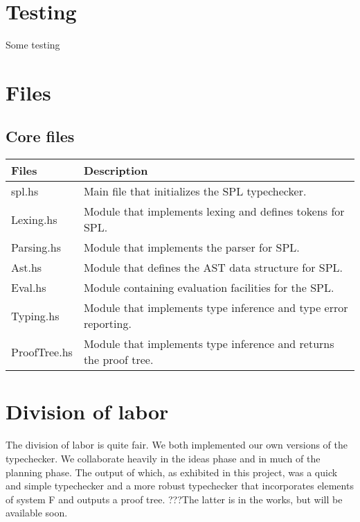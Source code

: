 \documentclass{article}
\begin{document}
\begin{prooftree}
\end{prooftree}

\begin{prooftree}
\end{prooftree}

\section{Testing}

Some testing

\section{Files}
\subsection{Core files}
\begin{tabular}{|p{20mm}|p{93mm}|}
  \hline
{\bf Files}&{\bf Description}\\
  \hline
spl.hs & Main file that initializes the SPL typechecker.\\
  \hline
Lexing.hs & Module that implements lexing and defines tokens for SPL.\\
  \hline
Parsing.hs & Module that implements the parser for SPL.\\
  \hline
Ast.hs & Module that defines the AST data structure for SPL.\\
  \hline
Eval.hs & Module containing evaluation facilities for the SPL.\\
  \hline
Typing.hs & Module that implements type inference and type error reporting.\\
  \hline
ProofTree.hs & Module that implements type inference and returns the proof tree.\\
  \hline
\end{tabular}

\section{Division of labor}
The division of labor is quite fair. We both implemented our own versions of the typechecker. We collaborate heavily in the ideas phase and in much of the planning phase. The output of which, as exhibited in this project, was a quick and simple typechecker and a more robust typechecker that incorporates elements of system F and outputs a proof tree. ???The latter is in the works, but will be available soon.
\end{document}
